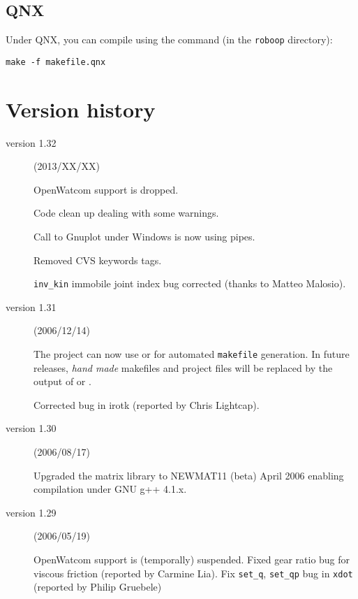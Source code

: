 \documentclass[11pt,fleqn,letterpaper]{report}
\begin{document}
\subsection{QNX}

Under \textsf{QNX}, you can compile using the command (in the
\texttt{roboop} directory):
\begin{verbatim}
make -f makefile.qnx
\end{verbatim}



\section{Version history}

\begin{description}

\item[version 1.32] (2013/XX/XX)

  \textsf{OpenWatcom} support is dropped.

  Code clean up dealing with some warnings.

  Call to \textsf{Gnuplot} under \textsf{Windows} is now using pipes.

  Removed \textsf{CVS} keywords tags.

  \texttt{inv_kin} immobile joint index bug corrected (thanks to
  Matteo Malosio).

\item[version 1.31] (2006/12/14)
  
  The project can now use
   or
  for automated \texttt{makefile} generation. In future releases,
  \emph{hand made} makefiles and project files will be replaced by the
  output of 
  or
  .

  Corrected bug in irotk (reported by Chris Lightcap).
  
\item[version 1.30] (2006/08/17)
  
  Upgraded the matrix library to \textsf{NEWMAT11 (beta) April 2006}
  enabling compilation under \textsf{GNU g++ 4.1.x}.
  
\item[version 1.29] (2006/05/19)
  
  \textsf{OpenWatcom} support is (temporally) suspended. Fixed gear
  ratio bug for viscous friction (reported by Carmine Lia). Fix
  \texttt{set\_q}, \texttt{set\_qp} bug in \texttt{xdot} (reported by
  Philip Gruebele)


\end{description}
\end{document}
